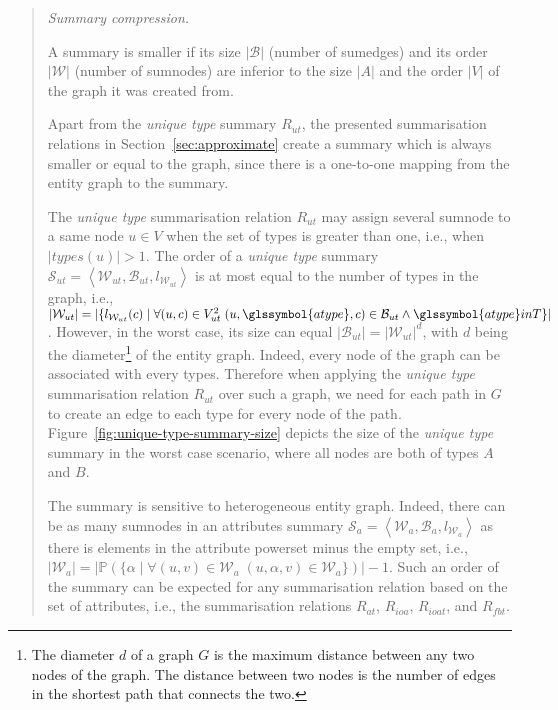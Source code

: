 \begin{quotation}
	\item[\emph{Summary compression.}]

	A summary is smaller if its size $\vert \mathcal{B} \vert$ (number of sumedges) and its order $\vert \mathcal{W} \vert$ (number of sumnodes) are inferior to the size $\vert A \vert$ and the order $\vert V \vert$ of the graph it was created from.

	Apart from the \emph{unique type} summary $R_{ut}$, the presented summarisation relations in Section~\ref{sec:approximate} create a summary which is always smaller or equal to the graph, since there is a one-to-one mapping from the entity graph to the summary.

	The \emph{unique type} summarisation relation $R_{ut}$ may assign several sumnode to a same node $u \in V$ when the set of types is greater than one, i.e., when $\vert types(u) \vert > 1$. The order of a \emph{unique type} summary $\mathcal{S}_{ut} = \left\langle \mathcal{W}_{ut}, \mathcal{B}_{ut}, l_{\mathcal{W}_{ut}} \right\rangle$ is at most equal to the number of types in the graph, i.e., $\vert \mathcal{W}_{ut} \vert = \vert \{ l_{\mathcal{W}_{ut}}(c) \mid \forall (u, c) \in V^2_{ut}\; (u, \glssymbol{atype}, c) \in \mathcal{B}_{ut} \wedge \glssymbol{atype} in T \} \vert$. However, in the worst case, its size can equal $\vert \mathcal{B}_{ut} \vert = \vert \mathcal{W}_{ut} \vert ^d$, with $d$ being the diameter\footnote{The diameter $d$ of a graph $G$ is the maximum distance between any two nodes of the graph. The distance between two nodes is the number of edges in the shortest path that connects the two.} of the entity graph. Indeed, every node of the graph can be associated with every types. Therefore when applying the \emph{unique type} summarisation relation $R_{ut}$ over such a graph, we need for each path in $G$ to create an edge to each type for every node of the path. Figure~\ref{fig:unique-type-summary-size} depicts the size of the \emph{unique type} summary in the worst case scenario, where all nodes are both of types $A$ and $B$.

	The summary is sensitive to heterogeneous entity graph. Indeed, there can be as many sumnodes in an attributes summary $\mathcal{S}_a = \left\langle \mathcal{W}_{a}, \mathcal{B}_{a}, l_{\mathcal{W}_{a}} \right\rangle$ as there is elements in the attribute powerset minus the empty set, i.e., $\vert \mathcal{W}_a \vert = \vert \mathbb{P} \left( \{ \alpha \mid \forall (u, v) \in \mathcal{W}_a\; (u, \alpha, v) \in \mathcal{W}_a \} \right) \vert - 1$. Such an order of the summary can be expected for any summarisation relation based on the set of attributes, i.e., the summarisation relations $R_{at}$, $R_{ioa}$, $R_{ioat}$, and $R_{fbt}$.\\


\end{quotation}
